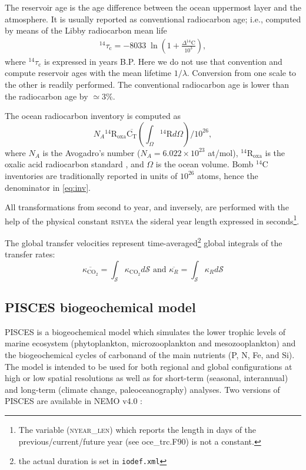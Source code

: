 \documentclass[../main/TOP_manual]{subfiles}
\newcommand{\cd}{\mathrm{CO_2}}
\newcommand{\Ct}{\mathrm{C_T}}
\newcommand{\cq}{\mathrm{^{14}C}}
\newcommand{\Dcq}{\Delta ^{14}\mathrm{C}}
\newcommand{\Rq}{\mathrm{^{14}{R}}}
\newcommand{\CODE}[1]{\textsc{#1}}
\begin{document}
The reservoir age is the age difference between the ocean uppermost layer and the atmosphere. It is usually reported as conventional radiocarbon age; i.e., computed by means of the Libby radiocarbon mean life \cite[8033 yr;][]{stuiver_1977}
\begin{align}
{^{14}\tau_\mathrm{c}}= -8033 \; \ln \left(1 + \frac{\Dcq}{10^3}\right), \label{eq:convage}
\end{align}
where ${^{14}\tau_\mathrm{c}}$ is expressed in years B.P. Here we do not use that convention and compute reservoir ages with the mean lifetime $1/\lambda$. Conversion from one scale to the other is readily performed. The conventional radiocarbon age is lower than the radiocarbon age by $\simeq3\%$.

The ocean radiocarbon  inventory is computed as
\begin{equation}
N_A \Rq_\mathrm{oxa} \overline{\Ct} \left( \int_\Omega \Rq d\Omega \right) /10^{26}, \label{eq:inv}
\end{equation}
where $N_A$ is the Avogadro's number ($N_A=6.022\times10^{23}$ at/mol), $\Rq_\mathrm{oxa}$ is the oxalic acid radiocarbon standard \cite[$\Rq_\mathrm{oxa}=1.176\times10^{-12}$;][]{stuiver_1977}, and $\Omega$ is the ocean volume.  Bomb $\cq$ inventories are traditionally reported in units of $10^{26}$ atoms, hence the denominator in \eqref{eq:inv}.

All transformations from second to year, and inversely, are performed with the help of the physical constant \CODE{rsiyea} the sideral year length expressed in seconds\footnote{The variable (\CODE{nyear\_len}) which reports the length in days of the previous/current/future year (see \textrm{oce\_trc.F90}) is not a constant. }.

The global transfer velocities represent time-averaged\footnote{the actual duration is set in \texttt{iodef.xml}} global integrals of the transfer rates:
 \begin{equation}
 \overline{\kappa_{\cd}}= \int_\mathcal{S} \kappa_{\cd} d\mathcal{S}  \text{ and } \overline{\kappa_R}= \int_\mathcal{S} \kappa_R d\mathcal{S}
\end{equation}


\subsection{PISCES biogeochemical model}

PISCES is a biogeochemical model which simulates the lower trophic levels of marine ecosystem (phytoplankton, microzooplankton and mesozooplankton) and the biogeochemical cycles of carbonand of the main nutrients (P, N, Fe, and Si). The  model is intended to be used for both regional and global configurations at high or low spatial resolutions as well as for  short-term (seasonal, interannual) and long-term (climate change, paleoceanography) analyses.
Two versions of PISCES are available in NEMO v4.0 :
\end{document}
